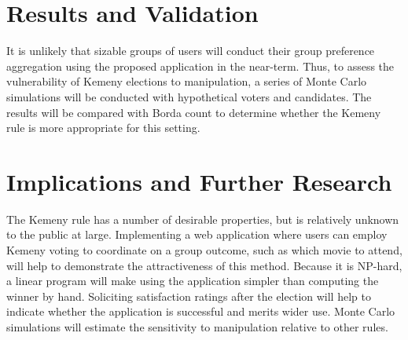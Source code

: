 \documentclass{article}
\begin{document}
\section{Results and Validation}


It is unlikely that sizable groups of users will conduct their group preference aggregation using the proposed application in the near-term. Thus, to assess the vulnerability of Kemeny elections to manipulation, a series of Monte Carlo simulations will be conducted with hypothetical voters and candidates. The results will be compared with Borda count to determine whether the Kemeny rule is more appropriate for this setting.

\section{Implications and Further Research}

The Kemeny rule has a number of desirable properties, but is relatively unknown to the public at large. Implementing a web application where users can employ Kemeny voting to coordinate on a group outcome, such as which movie to attend, will help to demonstrate the attractiveness of this method. Because it is NP-hard, a linear program will make using the application simpler than computing the winner by hand. Soliciting satisfaction ratings after the election will help to indicate whether the application is successful and merits wider use. Monte Carlo simulations will estimate the sensitivity to manipulation relative to other rules. 

\vspace{-0.3in}

\begingroup
\renewcommand{\section}[2]{}

\

\endgroup
\end{document}
